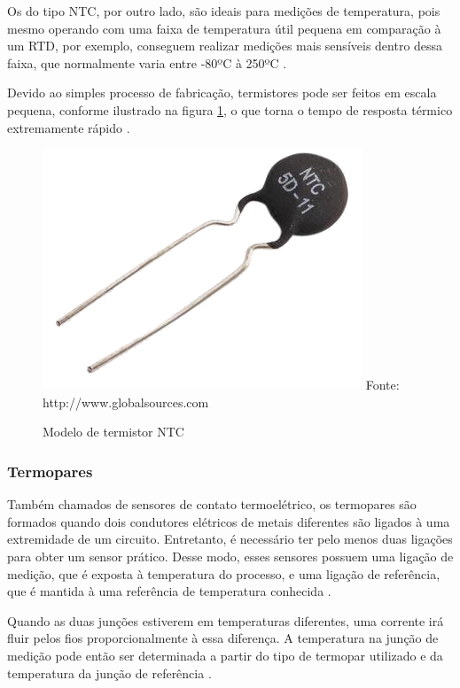 Os do tipo NTC, por outro lado, são ideais para medições de temperatura, pois mesmo operando com uma faixa de
temperatura útil pequena em comparação à um RTD, por exemplo, conseguem realizar medições mais sensíveis
dentro dessa faixa, que normalmente varia entre -80ºC à 250ºC \cite{sinclair2001,thomazini_albuquerque2005}.

Devido ao simples processo de fabricação, termistores pode ser feitos em escala pequena, conforme ilustrado na
figura \ref{figura:ntc}, o que torna o tempo de resposta térmico extremamente rápido
\cite{peeters_peetermans_indesteege2007,sinclair2001}.
\begin{figure}[H]
	\caption{Modelo de termistor NTC}
	\centering
	\includegraphics[scale=0.5]{../images/thermistor.png}
	\hspace{\linewidth}
	Fonte: http://www.globalsources.com
	\label{figura:ntc}
\end{figure}

\subsubsection{Termopares}
Também chamados de sensores de contato termoelétrico, os termopares são formados quando dois condutores
elétricos de metais diferentes são ligados à uma extremidade de um circuito. Entretanto, é necessário ter
pelo menos duas ligações para obter um sensor prático. Desse modo, esses sensores possuem uma ligação de
medição, que é exposta à temperatura do processo, e uma ligação de referência, que é mantida à uma referência
de temperatura conhecida \cite{fraden2010,fontes2005}.

Quando as duas junções estiverem em temperaturas diferentes, uma corrente irá fluir pelos fios
proporcionalmente à essa diferença. A temperatura na junção de medição pode então ser determinada a partir do
tipo de termopar utilizado e da temperatura da junção de referência \cite{fraden2010}.

